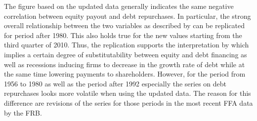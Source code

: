 The figure based on the updated data generally indicates the same negative correlation between equity payout and debt repurchases. In particular, the strong overall relationship between the two variables as described by \citeauthor{JERMANNfinancial} can be replicated for period after 1980. This also holds true for the new values starting from the third quarter of 2010. Thus, the replication supports the interpretation by \citeauthor{JERMANNfinancial} which implies a certain degree of substitutability between equity and debt financing as well as recessions inducing firms to decrease in the growth rate of debt while at the same time lowering payments to shareholders. However, for the period from 1956 to 1980 as well as the period after 1992 especially the series on debt repurchases looks more volatile when using the updated data. The reason for this difference are revisions of the series for those periods in the most recent FFA data by the FRB.
